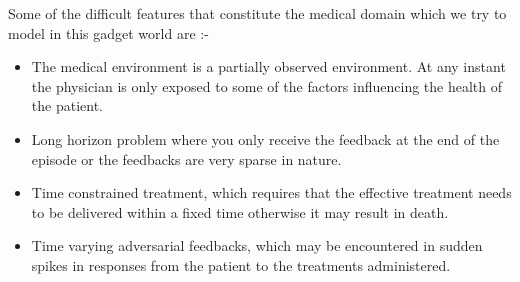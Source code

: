 Some of the difficult features that constitute the medical domain which we try to model in this gadget world are :-

\begin{itemize}
\item The medical environment is a partially observed environment. At any instant the physician is only exposed to some of the factors influencing the health of the patient.
\item Long horizon problem where you only receive the feedback at the end of the episode or the feedbacks are very sparse in nature.
\item Time constrained treatment, which requires that the effective treatment needs to be delivered within a fixed time otherwise it may result in death.
\item Time varying adversarial feedbacks, which may be encountered in sudden spikes in responses from the patient to the treatments administered.
\end{itemize}